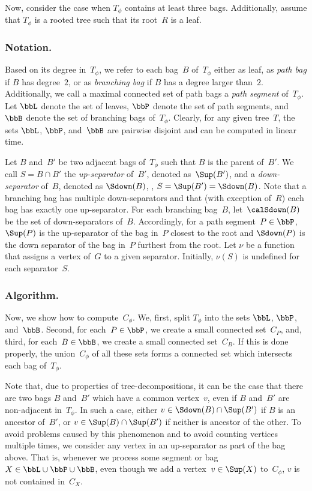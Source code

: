 Now, consider the case when $T_\phi$ contains at least three bags.
Additionally, assume that $T_\phi$ is a rooted tree such that its root~$R$ is a leaf.

\subsubsection{Notation.}
Based on its degree in~$T_\phi$, we refer to each bag~$B$ of~$T_\phi$ either as leaf, as \emph{path bag} if $B$ has degree~$2$, or as \emph{branching bag} if $B$ has a degree larger than~$2$.
Additionally, we call a maximal connected set of path bags a \emph{path segment} of~$T_\phi$.
Let $\bbL$ denote the set of leaves, $\bbP$ denote the set of path segments, and $\bbB$ denote the set of branching bags of~$T_\phi$.
Clearly, for any given tree~$T$, the sets $\bbL$, $\bbP$, and~$\bbB$ are pairwise disjoint and can be computed in linear time.

Let $B$ and~$B'$ be two adjacent bags of~$T_\phi$ such that $B$ is the parent of~$B'$.
We call $S = B \cap B'$ the \emph{up-separator} of~$B'$, denoted as~$\Sup(B')$, and a \emph{down-separator} of~$B$, denoted as $\Sdown(B)$, \ie, $S = \Sup(B') = \Sdown(B)$.
Note that a branching bag has multiple down-separators and that (with exception of~$R$) each bag has exactly one up-separator.
For each branching bag~$B$, let~$\calSdown(B)$ be the set of down-separators of~$B$.
Accordingly, for a path segment~$P \in \bbP$, $\Sup(P)$ is the up-separator of the bag in~$P$ closest to the root and $\Sdown(P)$ is the down separator of the bag in~$P$ furthest from the root.
Let $\nu$ be a function that assigns a vertex of~$G$ to a given separator.
Initially, $\nu(S)$ is undefined for each separator~$S$.


\subsubsection{Algorithm.}
Now, we show how to compute~$C_\phi$.
We, first, split $T_\phi$ into the sets $\bbL$, $\bbP$, and~$\bbB$.
Second, for each~$P \in \bbP$, we create a small connected set~$C_P$, and, third, for each~$B \in \bbB$, we create a small connected set~$C_B$.
If this is done properly, the union~$C_\phi$ of all these sets forms a connected set which intersects each bag of~$T_\phi$.

Note that, due to properties of tree-decompositions, it can be the case that there are two bags $B$ and~$B'$ which have a common vertex~$v$, even if $B$ and~$B'$ are non-adjacent in~$T_\phi$.
In such a case, either $v \in \Sdown(B) \cap \Sup(B')$ if $B$ is an ancestor of~$B'$, or $v \in \Sup(B) \cap \Sup(B')$ if neither is ancestor of the other.
To avoid problems caused by this phenomenon and to avoid counting vertices multiple times, we consider any vertex in an up-separator as part of the bag above.
That is, whenever we process some segment or bag~$X \in \bbL \cup \bbP \cup \bbB$, even though we add a vertex~$v \in \Sup(X)$ to~$C_\phi$, $v$ is not contained in~$C_X$.


